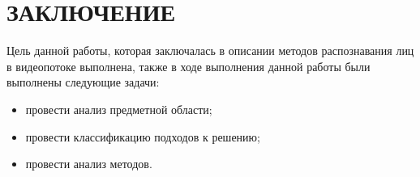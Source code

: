\chapter*{ЗАКЛЮЧЕНИЕ}


Цель данной работы, которая заключалась в описании методов распознавания лиц в 
видеопотоке выполнена, также в ходе выполнения данной работы были выполнены
следующие задачи:
\begin{itemize}[label=---]
  \item провести анализ предметной области;
  \item провести классификацию подходов к решению;
  \item провести анализ методов.
\end{itemize}

